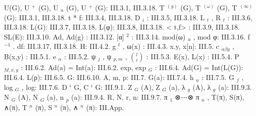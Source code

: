 U(G), U \(^{+}\) (G), U \(_{a}\) (G), U \(^{+}\) (G): III.3.1, III.3.18. T \(^{(y)}\) (G), T \(^{(\omega)}\) (G), T \(^{(\infty)}\) (G): III.3.1, III.3.18. t * f: III.3.4, III.3.18. D \(_{i}\) : III.3.5, III.3.18. L \(_{t}\) , R \(_{t}\) : III.3.6, III.3.18. L(G): III.3.7, III.3.18. L(φ): III.3.8, III.3.18. \textless{} t,f\textgreater{} : III.3.9, III.3.18. SL(E): III.3.10. Ad, Ad(g) : III.3.12. {[}α{]} \(^{2}\) : III.3.14. mod(ω) \(_{u}\) , mod φ: III.3.16. f \(^{-1}\) . df: III.3.17, III.3.18. H: III.4.2. g \(^{t}\) , ω(x) : III.4.3. x.y, x{[}n{]}: III.5. c \(_{\alpha\beta y}\) , B(x,y) : III.5.1. e \(_{\alpha}\) : III.5.2. ψ \(_{j}\) , ψ \(_{p,m}\) , \(\binom{l}{i}\) : III.5.3. E(x), L(x) : III.5.4. P \(_{M,x,y}\) : III.6.2. Ad(a) = Int(a): III.6.2. exp, exp \(_{G}\) : III.6.4. Ad(G) = Int(L(G)): III.6.4. L(ρ): III.6.5. G: III.6.10. A, m, p: III.7. G(a): III.7.4. h \(_{n}\) : III.7.5. G \(_{f}\) , log \(_{G}\) , log: III.7.6. D \(^{i}\) G, C \(^{i}\) G: III.9.1. Z \(_{G}\) (A), Z \(_{G}\) (a), λ \(_{g}\) (A), λ \(_{g}\) (a): III.9.3. N \(_{G}\) (A), N \(_{G}\) (a), n \(_{p}\) (a): III.9.4. R, N, r, n: III.9.7. π \(_{1}\) ⊗⋯⊗ π \(_{n}\) , T(π), S(π), ∧(π), T \(^{n}\) (π), S \(^{n}\) (π), ∧ \(^{n}\) (π): III.App.


